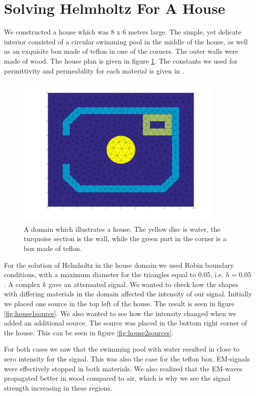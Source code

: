 \documentclass[10pt,a4paper]{article}
\begin{document}
\section*{Solving Helmholtz For A House}
We constructed a house which was 8 x 6 meters large. The simple, yet delicate interior consisted of a circular swimming pool in the middle of the house, as well as an exquisite box made of teflon in one of the corners. The outer walls were made of wood. The house plan is given in figure \ref{fig:housePlan}. The constants we used for permittivity and permeability for each material is given in \cite{dielectric}.

\begin{figure}[h]
\centering
    \includegraphics[width=0.9\textwidth]{figures/geometry.pdf}
	\caption{A domain which illustrates a house. The yellow disc is water, the turquoise section is the wall, while the green part in the corner is a box made of teflon.}
  \label{fig:housePlan}
\end{figure}

For the solution of Helmholtz in the house domain we used Robin boundary conditions, with a maximum diameter for the triangles equal to 0.05, i.e. $h = 0.05$. A complex $k$ gave an attenuated signal. We wanted to check how the shapes with differing materials in the domain affected the intensity of our signal. Initially we placed one source in the top left of the house. The result is seen in figure \ref{fig:house1source}. We also wanted to see how the intensity changed when we added an additional source. The source was placed in the bottom right corner of the house. This can be seen in figure \ref{fig:house2sources}. 

For both cases we saw that the swimming pool with water resulted in close to zero intensity for the signal. This was also the case for the teflon box. EM-signals were effectively stopped in both materials. We also realized that the EM-waves propagated better in wood compared to air, which is why we see the signal strength increasing in these regions.
\end{document}
